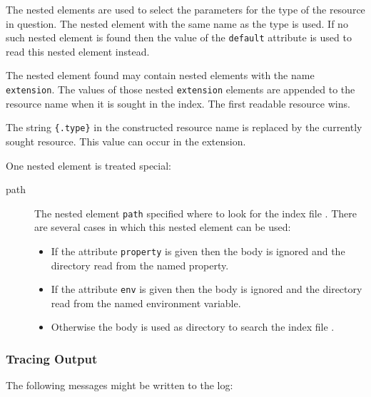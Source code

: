 The nested elements are used to select the parameters for the type of
the resource in question. The nested element with the same name as the
type is used. If no such nested element is found then the value of the
\texttt{default} attribute is used to read this nested element
instead. 

The nested element found may contain nested elements with the name
\texttt{extension}. The values of those nested \texttt{extension}
elements are appended to the resource name when it is sought in the
index. The first readable resource wins.

The string \verb|{.type}| in the constructed resource name is replaced
by the currently sought resource. This value can occur in the
extension.

One nested element is treated special:

\begin{description}
\item[path] The nested element \texttt{path} specified where to look
  for the index file . There are several cases in which
  this nested element can be used:
  \begin{itemize}
  \item If the attribute \texttt{property} is given then the body is
    ignored and the directory read from the named property.
  \item If the attribute \texttt{env} is given then the body is
    ignored and the directory read from the named environment
    variable.
  \item Otherwise the body is used as directory to search the index
    file .
  \end{itemize}
\end{description}

\subsubsection*{Tracing Output}

The following messages might be written to the log:

